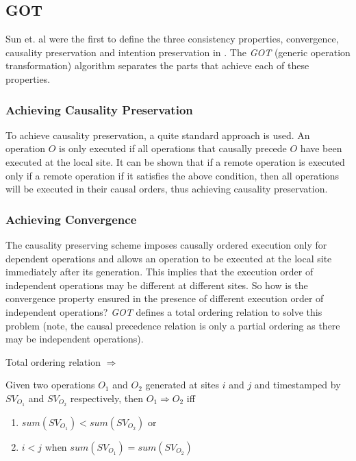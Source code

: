 \subsection{GOT}
\label{algo:got}

Sun et. al were the first to define the three consistency properties, convergence, causality preservation and intention preservation in \cite{sun98a}.  The \emph{GOT} (generic operation transformation) algorithm separates the parts that achieve each of these properties.

\subsubsection{Achieving Causality Preservation}
To achieve causality preservation, a quite standard approach is used. An operation $O$ is only executed if all operations that causally precede $O$ have been executed at the local site. It can be shown that if a remote operation is executed only if a remote operation if it satisfies the above condition, then all operations will be executed in their causal orders, thus achieving causality preservation.

\subsubsection{Achieving Convergence}
The causality preserving scheme imposes causally ordered execution only for dependent operations and allows an operation to be executed at the local site immediately after its generation. This implies that the execution order of independent operations may be different at different sites. So how is the convergence property ensured in the presence of different execution order of independent operations? \emph{GOT} defines a total ordering relation to solve this problem (note, the causal precedence relation is only a partial ordering as there may be independent operations).

\begin{defn}
Total ordering relation $\Rightarrow$
\end{defn}

Given two operations $O_{1}$ and $O_{2}$ generated at sites $i$ and $j$ and timestamped by $SV_{O_{1}}$ and $SV_{O_{2}}$ respectively, then $O_{1} \Rightarrow O_{2}$ iff

\begin{enumerate}
 \item $sum(SV_{O_{1}}) < sum(SV_{O_{2}})$ or
 \item $i < j$ when $sum(SV_{O_{1}}) = sum(SV_{O_{2}})$
\end{enumerate}

